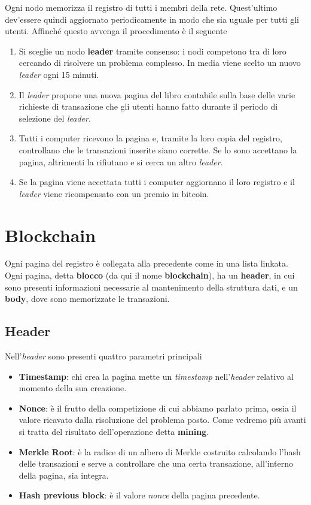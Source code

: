 Ogni nodo memorizza il registro di tutti i membri della rete. Quest'ultimo dev'essere quindi aggiornato periodicamente
in modo che sia uguale per tutti gli utenti. Affinch\'e questo avvenga il procedimento \`e il seguente
\begin{enumerate}
	\item Si sceglie un nodo \textbf{leader} tramite consenso: i nodi competono tra di loro cercando di risolvere un
	      problema complesso. In media viene scelto un nuovo \emph{leader} ogni 15 minuti.
	\item Il \emph{leader} propone una nuova pagina del libro contabile sulla base delle varie richieste di transazione
	      che gli utenti hanno fatto durante il periodo di selezione del \emph{leader}.
	\item Tutti i computer ricevono la pagina e, tramite la loro copia del registro, controllano che le transazioni
	      inserite siano corrette. Se lo sono accettano la pagina, altrimenti la rifiutano e si cerca un altro
	      \emph{leader}.
	\item Se la pagina viene accettata tutti i computer aggiornano il loro registro e il \emph{leader} viene ricompensato
	      con un premio in bitcoin.
\end{enumerate}

\section{Blockchain}
Ogni pagina del registro \`e collegata alla precedente come in una lista linkata. Ogni pagina, detta \textbf{blocco}
(da qui il nome \textbf{blockchain}), ha un \textbf{header}, in cui sono presenti informazioni necessarie al
mantenimento della struttura dati, e un \textbf{body}, dove sono memorizzate le transazioni.

\subsection{Header}
Nell'\emph{header} sono presenti quattro parametri principali
\begin{itemize}
	\item \textbf{Timestamp}: chi crea la pagina mette un \emph{timestamp} nell'\emph{header} relativo al momento
	      della sua creazione.
	\item \textbf{Nonce}: \`e il frutto della competizione di cui abbiamo parlato prima, ossia il valore ricavato
	      dalla risoluzione del problema posto. Come vedremo pi\`u avanti si tratta del risultato dell'operazione
	      detta \textbf{mining}.
	\item \textbf{Merkle Root}: \`e la radice di un albero di Merkle costruito calcolando l'hash delle transazioni
	      e serve a controllare che una certa transazione, all'interno della pagina, sia integra.
	\item \textbf{Hash previous block}: \`e il valore \emph{nonce} della pagina precedente.
\end{itemize}

